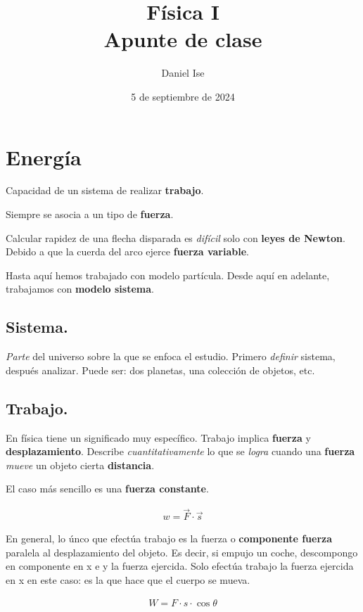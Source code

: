 \documentclass{article}
\title{Física I\\Apunte de clase}
\author{Daniel Ise}
\date{5 de septiembre de 2024}
\begin{document}
\maketitle
\tableofcontents

\section{Energía}

Capacidad de un sistema de realizar \textbf{trabajo}.

Siempre se asocia a un tipo de \textbf{fuerza}.

Calcular rapidez de una flecha disparada es \textit{difícil} solo con \textbf{leyes de Newton}.
Debido a que la cuerda del arco ejerce \textbf{fuerza variable}.

Hasta aquí hemos trabajado con modelo partícula.
Desde aquí en adelante, trabajamos con \textbf{modelo sistema}.

\subsection{Sistema.}

\textit{Parte} del universo sobre la que se enfoca el estudio.
Primero \textit{definir} sistema, después analizar.
Puede ser: dos planetas, una colección de objetos, etc.

\subsection{Trabajo.}

En física tiene un significado muy específico.
Trabajo implica \textbf{fuerza} y \textbf{desplazamiento}.
Describe \textit{cuantitativamente} lo que se \textit{logra} cuando
una \textbf{fuerza} \textit{mueve} un objeto cierta \textbf{distancia}.

El caso más sencillo es una \textbf{fuerza constante}.

\begin{align*}
    w = \vec{F} \cdot \vec{s}
\end{align*}

En general, lo únco que efectúa trabajo es la fuerza o \textbf{componente fuerza}
paralela al desplazamiento del objeto. Es decir, si empujo un coche,
descompongo en componente en x e y la fuerza ejercida. Solo efectúa trabajo la
fuerza ejercida en x en este caso: es la que hace que el cuerpo se mueva.

\begin{align*}
    W = F \cdot s \cdot \cos \theta
\end{align*}
\end{document}
